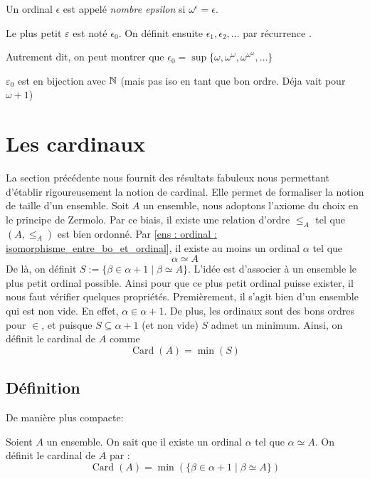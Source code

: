 \begin{definition}
	Un ordinal $\epsilon$ est appelé \emph{nombre epsilon} si $\omega^\epsilon = \epsilon$.

	Le plus petit $\varepsilon$ est noté $\epsilon_0$. On définit ensuite $\epsilon_1, \epsilon_2, \ldots$ par récurrence .
\end{definition}
\begin{remarque}
Autrement dit, on peut montrer que $\epsilon_0= \operatorname{sup}\{\omega, \omega^\omega, \omega^{\omega^{\omega}}, \dots\}$
\end{remarque}
\begin{theoreme}
    $\varepsilon_0$ est en bijection avec $\mathbb{N}$ (mais pas iso en tant que bon ordre. Déja vait pour $\omega +1$)
\end{theoreme}



\newpage
\section{Les cardinaux}
La section précédente nous fournit des résultats fabuleux nous permettant d'établir rigoureusement la notion de cardinal. Elle permet de formaliser la notion de taille d'un ensemble.
Soit $A$ un ensemble, nous adoptons l'axiome du choix en le principe de Zermolo. Par ce biais, il existe une relation d'ordre $\le_A$ tel que $(A,\le_A)$ est bien ordonné. Par \ref{ens : ordinal : isomorphisme_entre_bo_et_ordinal}, il existe au moins un ordinal $\alpha$ tel que $$\alpha \simeq A$$
De là, on définit $S:= \{\beta\in \alpha +1\mid \beta\simeq A\}$. L'idée est d'associer à un ensemble le plus petit ordinal possible. Ainsi pour que ce plus petit ordinal puisse exister, il nous faut vérifier quelques propriétés. Premièrement, il s'agit bien d'un ensemble qui est non vide. En effet, $\alpha \in \alpha+1$. De plus, les ordinaux sont des bons ordres pour $\in$, et puisque $S\subseteq \alpha+1$ (et non vide) $S$ admet un minimum. Ainsi, on définit le cardinal de $A$ comme 
\[
\operatorname{Card}(A)= \operatorname{min}(S)
\]

\subsection{Définition}

De manière plus compacte:

\begin{definition}
    Soient $A$ un ensemble. On sait que il existe un ordinal $\alpha$ tel que $\alpha\simeq A$. On définit le cardinal de $A$ par :
    \[
    \operatorname{Card}(A)=\operatorname{min}(\{\beta\in \alpha+1\mid \beta \simeq A\})
    \]
\end{definition}

